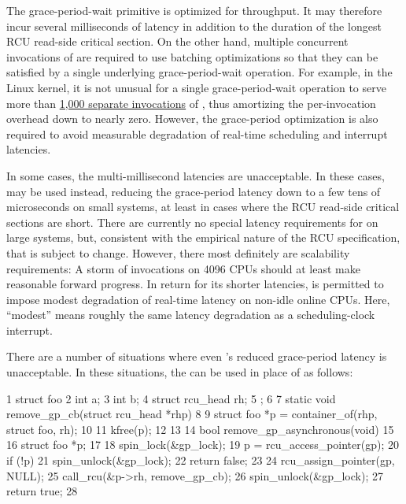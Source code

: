 The  grace-period-wait primitive is optimized for
throughput.
It may therefore incur several milliseconds of latency in
addition to the duration of the longest RCU read-side critical section.
On the other hand, multiple concurrent invocations of
 are required to use batching optimizations so that
they can be satisfied by a single underlying grace-period-wait
operation.
For example, in the Linux kernel, it is not unusual for a
single grace-period-wait operation to serve more than
\href{https://www.usenix.org/conference/2004-usenix-annual-technical-conference/making-rcu-safe-deep-sub-millisecond-response}{1,000 separate invocations}
of , thus amortizing the per-invocation overhead
down to nearly zero.
However, the grace-period optimization is also
required to avoid measurable degradation of real-time scheduling and
interrupt latencies.

In some cases, the multi-millisecond  latencies are
unacceptable.
In these cases,  may be
used instead, reducing the grace-period latency down to a few tens of
microseconds on small systems, at least in cases where the RCU read-side
critical sections are short.
There are currently no special latency
requirements for  on large systems, but,
consistent with the empirical nature of the RCU specification, that is
subject to change.
However, there most definitely are scalability
requirements:
A storm of  invocations on
4096 CPUs should at least make reasonable forward progress.
In return
for its shorter latencies,  is permitted
to impose modest degradation of real-time latency on non-idle online
CPUs.
Here, ``modest'' means roughly the same latency degradation as a
scheduling-clock interrupt.

There are a number of situations where even
's reduced grace-period latency is
unacceptable.
In these situations, the  can
be used in place of  as follows:

\begin{VerbatimN}
       1 struct foo {
       2   int a;
       3   int b;
       4   struct rcu_head rh;
       5 };
       6
       7 static void remove_gp_cb(struct rcu_head *rhp)
       8 {
       9   struct foo *p = container_of(rhp, struct foo, rh);
      10
      11   kfree(p);
      12 }
      13
      14 bool remove_gp_asynchronous(void)
      15 {
      16   struct foo *p;
      17
      18   spin_lock(&gp_lock);
      19   p = rcu_access_pointer(gp);
      20   if (!p) {
      21     spin_unlock(&gp_lock);
      22     return false;
      23   }
      24   rcu_assign_pointer(gp, NULL);
      25   call_rcu(&p->rh, remove_gp_cb);
      26   spin_unlock(&gp_lock);
      27   return true;
      28 }
\end{VerbatimN}

